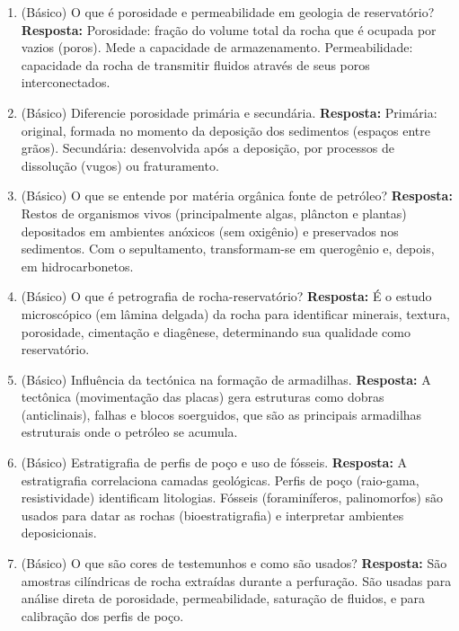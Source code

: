 \documentclass[11pt,a4paper]{article}
\begin{document}
\begin{enumerate}
  \item (Básico) O que é porosidade e permeabilidade em geologia de reservatório?
  \textbf{Resposta:} Porosidade: fração do volume total da rocha que é ocupada por vazios (poros). Mede a capacidade de armazenamento. Permeabilidade: capacidade da rocha de transmitir fluidos através de seus poros interconectados.

  \item (Básico) Diferencie porosidade primária e secundária.
  \textbf{Resposta:} Primária: original, formada no momento da deposição dos sedimentos (espaços entre grãos). Secundária: desenvolvida após a deposição, por processos de dissolução (vugos) ou fraturamento.

  \item (Básico) O que se entende por matéria orgânica fonte de petróleo?
  \textbf{Resposta:} Restos de organismos vivos (principalmente algas, plâncton e plantas) depositados em ambientes anóxicos (sem oxigênio) e preservados nos sedimentos. Com o sepultamento, transformam-se em querogênio e, depois, em hidrocarbonetos.

  \item (Básico) O que é petrografia de rocha-reservatório?
  \textbf{Resposta:} É o estudo microscópico (em lâmina delgada) da rocha para identificar minerais, textura, porosidade, cimentação e diagênese, determinando sua qualidade como reservatório.

  \item (Básico) Influência da tectónica na formação de armadilhas.
  \textbf{Resposta:} A tectônica (movimentação das placas) gera estruturas como dobras (anticlinais), falhas e blocos soerguidos, que são as principais armadilhas estruturais onde o petróleo se acumula.

  \item (Básico) Estratigrafia de perfis de poço e uso de fósseis.
  \textbf{Resposta:} A estratigrafia correlaciona camadas geológicas. Perfis de poço (raio-gama, resistividade) identificam litologias. Fósseis (foraminíferos, palinomorfos) são usados para datar as rochas (bioestratigrafia) e interpretar ambientes deposicionais.

  \item (Básico) O que são cores de testemunhos e como são usados?
  \textbf{Resposta:} São amostras cilíndricas de rocha extraídas durante a perfuração. São usadas para análise direta de porosidade, permeabilidade, saturação de fluidos, e para calibração dos perfis de poço.


\end{enumerate}
\end{document}

